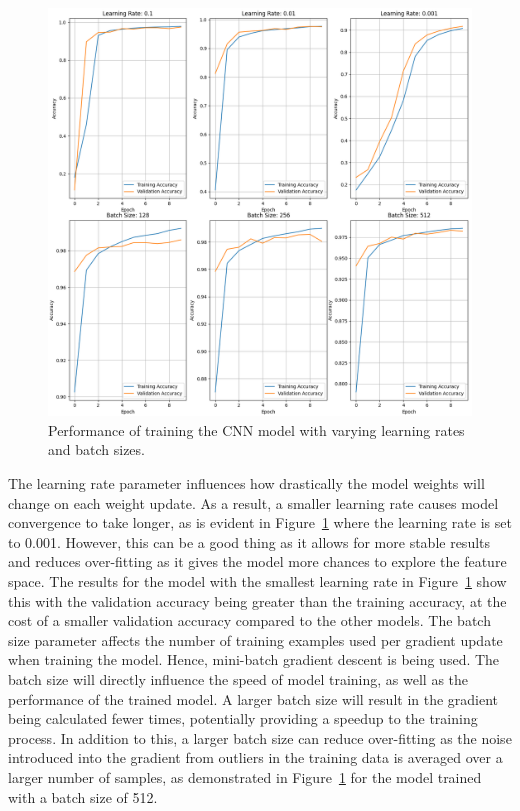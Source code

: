 \documentclass[a4paper]{article}
\begin{document}
\begin{figure}[h!]
    \centering
    \includegraphics[scale=0.4]{images/learning-rate-batch-size-cnn.png}
    \caption{Performance of training the CNN model with varying learning rates and batch sizes.}
    \label{fig:training-params}
\end{figure}

The learning rate parameter influences how drastically the model weights will change on each weight update. As a result, a smaller learning rate causes model convergence to take longer, as is evident in Figure~\ref{fig:training-params} where the learning rate is set to 0.001. However, this can be a good thing as it allows for more stable results and reduces over-fitting as it gives the model more chances to explore the feature space. The results for the model with the smallest learning rate in Figure~\ref{fig:training-params} show this with the validation accuracy being greater than the training accuracy, at the cost of a smaller validation accuracy compared to the other models. The batch size parameter affects the number of training examples used per gradient update when training the model. Hence, mini-batch gradient descent is being used. The batch size will directly influence the speed of model training, as well as the performance of the trained model. A larger batch size will result in the gradient being calculated fewer times, potentially providing a speedup to the training process. In addition to this, a larger batch size can reduce over-fitting as the noise introduced into the gradient from outliers in the training data is averaged over a larger number of samples, as demonstrated in Figure~\ref{fig:training-params} for the model trained with a batch size of 512.
\end{document}
